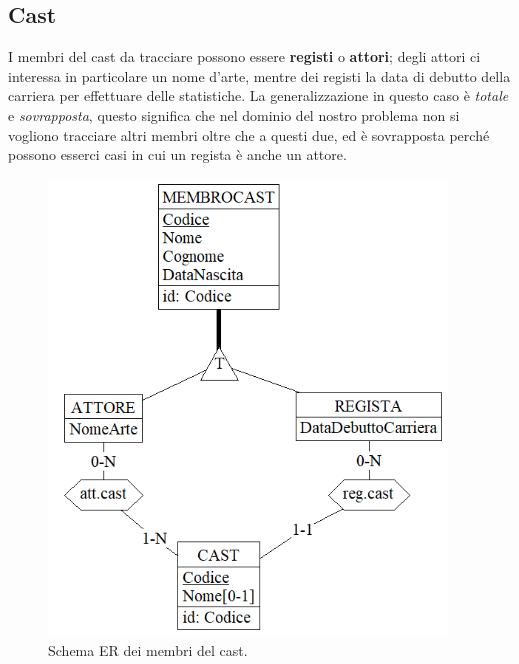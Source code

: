 \documentclass[a4paper,12pt]{report}
\begin{document}
\subsection{Cast}
I membri del cast da tracciare possono essere \textbf{registi} o \textbf{attori}; degli attori ci interessa in particolare un nome d'arte, mentre dei registi la data di debutto della carriera per effettuare delle statistiche. La generalizzazione in questo caso è \textit{totale} e \textit{sovrapposta}, questo significa che nel dominio del nostro problema non si vogliono tracciare altri membri oltre che a questi due, ed è sovrapposta perché possono esserci casi in cui un regista è anche un attore.
\begin{figure}[H]
	\centering
	\includegraphics[width=300pt]{ER/cast.png}
	\caption{Schema ER dei membri del cast.}
\end{figure}
\end{document}
